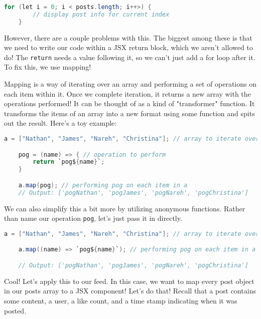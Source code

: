 \begin{lstlisting}[language=Java]
    for (let i = 0; i < posts.length; i++>) {
        // display post info for current index
    }
\end{lstlisting}

However, there are a couple problems with this. The biggest among these is that we need to write our code within a JSX return block, which we aren't allowed to do! The \texttt{return} needs a value following it, so we can't just add a for loop after it. To fix this, we use mapping!

Mapping is a way of iterating over an array and performing a set of operations on each item within it. Once we complete iteration, it returns a new array with the operations performed! It can be thought of as a kind of "transformer" function. It transforms the items of an array into a new format using some function and spits out the result. Here's a toy example:

\begin{lstlisting}[language=Java]
    a = ["Nathan", "James", "Nareh", "Christina"]; // array to iterate over

    pog = (name) => { // operation to perform
        return `pog${name}`;
    }

    a.map(pog); // performing pog on each item in a
    // Output: ['pogNathan', 'pogJames', 'pogNareh', 'pogChristina']
\end{lstlisting}

We can also simplify this a bit more by utilizing anonymous functions. Rather than name our operation \texttt{pog}, let's just pass it in directly.

\begin{lstlisting}[language=Java]
    a = ["Nathan", "James", "Nareh", "Christina"]; // array to iterate over

    a.map((name) => `pog${name}`); // performing pog on each item in a

    // Output: ['pogNathan', 'pogJames', 'pogNareh', 'pogChristina']
\end{lstlisting}

Cool! Let's apply this to our feed. In this case, we want to map every post object in our posts array to a JSX component! Let's do that! Recall that a post contains some content, a user, a like count, and a time stamp indicating when it was posted. 

